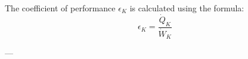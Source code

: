 The coefficient of performance \( \epsilon_K \) is calculated using the formula:  
\[
\epsilon_K = \frac{\dot{Q}_K}{\dot{W}_K}
\]  

---